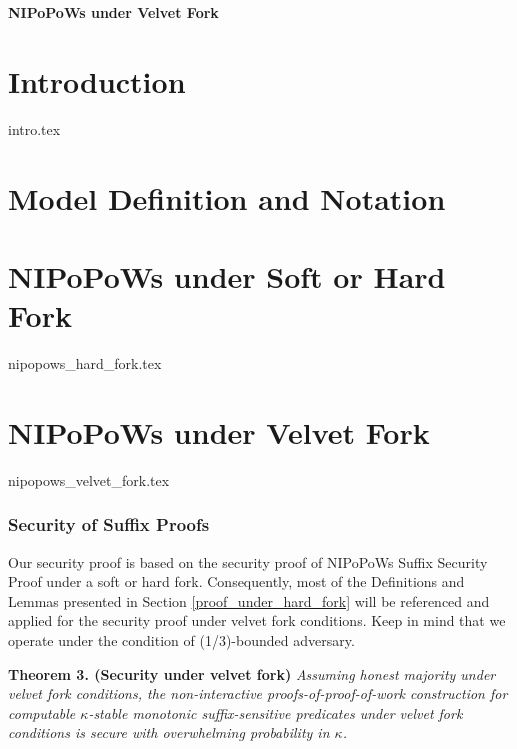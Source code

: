 \documentclass[11pt,a4paper]{article}
\begin{document}
\begin{center}
\begin{Large}
\textbf{NIPoPoWs under Velvet Fork\\}
\end{Large}

\end{center}

\section{Introduction}
{intro.tex}

\section{Model Definition and Notation}

\section{NIPoPoWs under Soft or Hard Fork}
{nipopows_hard_fork.tex}

\section{NIPoPoWs under Velvet Fork}
{nipopows_velvet_fork.tex}


\subsubsection{Security of Suffix Proofs}
Our security proof is based on the security proof of NIPoPoWs Suffix Security Proof under a soft or hard fork. Consequently, most of the Definitions and Lemmas presented in Section \ref{proof_under_hard_fork} will be referenced and applied for the security proof under velvet fork conditions. Keep in mind that we operate under the condition of (1/3)-bounded adversary.

\textbf{Theorem 3. (Security under velvet fork)} \textit{Assuming honest majority under velvet fork conditions, the non-interactive proofs-of-proof-of-work construction for computable $\kappa$-stable monotonic suffix-sensitive predicates under velvet fork conditions is secure with overwhelming probability in $\kappa$.}\\
\end{document}
